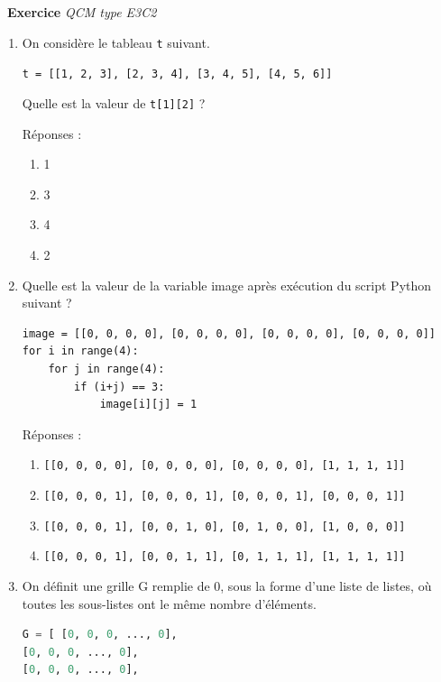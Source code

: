 \documentclass[a4paper, french, 12pt]{article}
\newcounter{exo}
\newenvironment{exercice}[1]
{\par \medskip   \addtocounter{exo}{1} \noindent  
\begin{bclogo}[arrondi =0.1,   noborder = true, logo=\bccrayon, marge=4]{~\textbf{Exercice} \textbf{\theexo} {\itshape #1} }  \par}
{
\end{bclogo}
 \par \bigskip }
\begin{document}
\begin{exercice}{QCM type E3C2}

\begin{enumerate}
\item On considère le tableau \texttt{t} suivant.

\lstinline!t = [[1, 2, 3], [2, 3, 4], [3, 4, 5], [4, 5, 6]]!

Quelle est la valeur de \texttt{t[1][2]} ?

Réponses :

\begin{multicols}{4}

\begin{enumerate}
\item
  1
\item
  3
\item
  4
\item
  2
\end{enumerate}
\end{multicols}

\item Quelle est la valeur de la variable image après exécution du script
Python suivant ?

\begin{lstlisting}[style=rond]
image = [[0, 0, 0, 0], [0, 0, 0, 0], [0, 0, 0, 0], [0, 0, 0, 0]]
for i in range(4):
    for j in range(4):
        if (i+j) == 3:
            image[i][j] = 1
\end{lstlisting}

Réponses :

\begin{enumerate}
\item
  \lstinline![[0, 0, 0, 0], [0, 0, 0, 0], [0, 0, 0, 0], [1, 1, 1, 1]]!
\item
  \lstinline![[0, 0, 0, 1], [0, 0, 0, 1], [0, 0, 0, 1], [0, 0, 0, 1]]!
\item
  \lstinline![[0, 0, 0, 1], [0, 0, 1, 0], [0, 1, 0, 0], [1, 0, 0, 0]]!
\item
 \lstinline![[0, 0, 0, 1], [0, 0, 1, 1], [0, 1, 1, 1], [1, 1, 1, 1]]!
\end{enumerate}


\item On définit une grille G remplie de 0, sous la forme d'une liste de
listes, où toutes les sous-listes ont le même nombre d'éléments.

\begin{lstlisting}[language=Python]
G = [ [0, 0, 0, ..., 0],
[0, 0, 0, ..., 0],
[0, 0, 0, ..., 0],


\end{lstlisting}
\end{enumerate}
\end{exercice}
\end{document}
